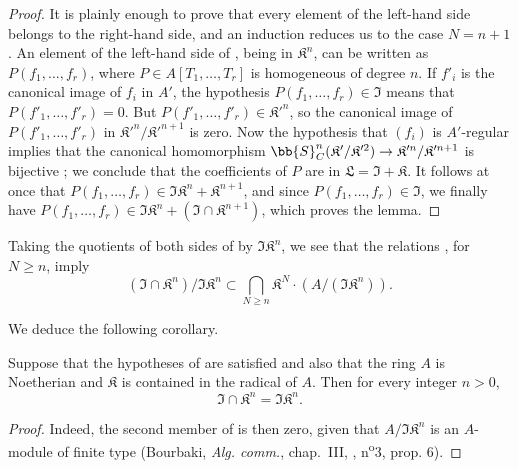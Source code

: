 \begin{proof}
It is plainly enough to prove that every element of the left-hand side belongs to the right-hand side, and an induction reduces us to the case $N = n + 1$.
An element of the left-hand side of , being in $\mathfrak{K}^n$, can be written as $P(f_1, \dots, f_r)$, where $P \in A[T_1, \dots, T_r]$ is homogeneous of degree $n$.
If $f'_i$ is the canonical image of $f_i$ in $A'$, the hypothesis $P(f_1, \dots, f_r) \in \mathfrak{I}$ means that $P(f'_1, \dots, f'_r) = 0$.
But $P(f'_1, \dots, f'_r) \in \mathfrak{K}'^n$, so the canonical image of $P(f'_1, \dots, f'_r)$ in $\mathfrak{K}'^n/\mathfrak{K}'^{n+1}$ is zero.
Now the hypothesis that $(f_i)$ is $A'$-regular implies that the canonical homomorphism $\bb{S}_C^n(\mathfrak{K}'/\mathfrak{K}'^2) \to \mathfrak{K}'^n/\mathfrak{K}'^{n+1}$ is bijective ;
we conclude that the coefficients of $P$ are in $\mathfrak{L} = \mathfrak{I} + \mathfrak{K}$.
It follows at once that $P(f_1, \dots, f_r) \in \mathfrak{I}\mathfrak{K}^n + \mathfrak{K}^{n+1}$, and since $P(f_1, \dots, f_r) \in \mathfrak{I}$, we finally have $P(f_1, \dots, f_r) \in \mathfrak{I}\mathfrak{K}^n + (\mathfrak{I} \cap \mathfrak{K}^{n+1})$, which proves the lemma.
\end{proof}

Taking the quotients of both sides of  by $\mathfrak{I}\mathfrak{K}^{n}$, we see that the relations , for $N \geq n$, imply
\[
  \label{IV.16.9.13.4}
  (\mathfrak{I} \cap \mathfrak{K}^n)/\mathfrak{I}\mathfrak{K}^n \subset \bigcap_{N \geq n} \mathfrak{K}^N \cdot (A/(\mathfrak{I}\mathfrak{K}^n)).
  \tag{16.9.13.4}
\]

We deduce the following corollary.

\begin{corollary}[16.9.13.5]
\label{IV.16.9.13.5}
Suppose that the hypotheses of  are satisfied and also that the ring $A$ is Noetherian and $\mathfrak{K}$ is contained in the radical of $A$.
Then for every integer $n > 0$,
\[
  \label{IV.16.9.13.6}
  \mathfrak{I} \cap \mathfrak{K}^n = \mathfrak{I}\mathfrak{K}^n.
  \tag{16.9.13.6}
\]
\end{corollary}

\begin{proof}
Indeed, the second member of  is then zero, given that $A/\mathfrak{I}\mathfrak{K}^n$ is an $A$-module of finite type (Bourbaki, \emph{Alg. comm.}, chap.~III, , n\textsuperscript{o}3, prop. 6).
\end{proof}

